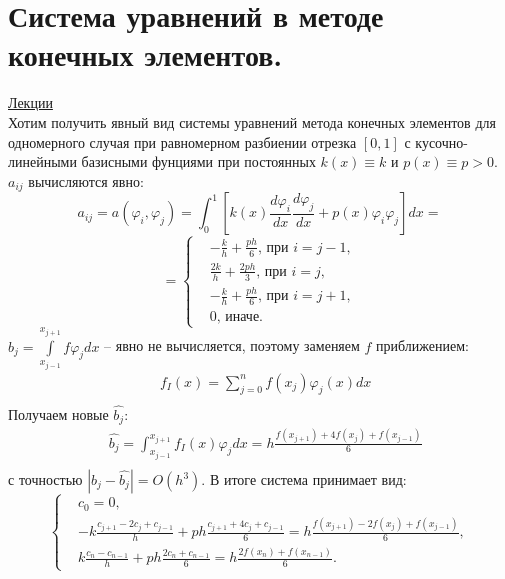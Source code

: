 \documentclass[specialist, subf, href, colorlinks=true, 12pt, times, mtpro, final]{disser}
\theoremstyle{definition}
\begin{document}
{\section {Система уравнений в методе конечных элементов.}
    \hyperlink {lects.106}{Лекции}\\
    Хотим получить явный вид системы уравнений метода конечных элементов для одномерного случая при равномерном разбиении отрезка $[0,1]$ с кусочно-линейными базисными фунциями при постоянных $k(x) \equiv k$ и $p(x) \equiv p > 0$.\\
    $a_{ij}$ вычисляются явно:
    $$
        a_{ij} = a(\varphi_i, \varphi_j) = \int_0^1\left[k(x) \frac{d \varphi_i}{dx} \frac{d \varphi_j}{dx} + p(x) \varphi_i \varphi_j\right]dx =
    $$
    $$
        =
        \left\{
        \begin{aligned}
            & - \frac{k}{h} + \frac{ph}{6} \text{, при } i =j-1,\\
            & \frac{2k}{h} + \frac{2ph}{3} \text{, при } i =j,\\
            & - \frac{k}{h} + \frac{ph}{6} \text{, при } i =j+1,\\
            & 0 \text{, иначе.}
        \end{aligned}
        \right.
    $$
    $b_{j} = \int\limits_{x_{j-1}}^{x_{j+1}} f \varphi_j dx$ -- явно не вычисляется, поэтому заменяем $f$ приближением:
    $$
        \begin{aligned}
            & f_I(x) = \sum_{j = 0}^n f(x_j) \varphi_j(x) dx\\
        \end{aligned}
    $$
    Получаем новые $\hat{b_j}$:
    $$
        \begin{aligned}
            & \hat{b_j} = \int_{x_{j-1}}^{x_{j+1}} f_I(x) \varphi_j dx = h \frac{f(x_{j+1}) + 4f(x_j) + f(x_{j-1})}{6}\\
        \end{aligned}
    $$
    с точностью $|b_j - \hat{b_j}| = O(h^3)$.
    В итоге система принимает вид:
    $$
        \left\{
        \begin{aligned}
            & c_0 = 0,\\
            & -k \frac{c_{j+1} - 2 c_j + c_{j-1}}{h} + ph \frac{c_{j+1} + 4 c_j + c_{j-1}}{6} = h \frac{f(x_{j+1}) - 2 f(x_j) + f(x_{j-1})}{6},\\
            & k \frac{c_n - c_{n-1}}{h} + ph \frac{2c_n + c_{n-1}}{6} = h \frac{2f(x_n) + f(x_{n-1})}{6}.
        \end{aligned}
        \right.
    $$

}
\end{document}
